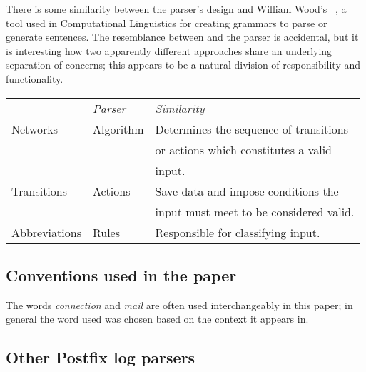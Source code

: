 There is some similarity between the parser's design and William Wood's
\ATN{}~\cite{atns, nlpip}, a tool used in Computational Linguistics for
creating grammars to parse or generate sentences.  The resemblance between
\ATN{} and the parser is accidental, but it is interesting how two
apparently different approaches share an underlying separation of concerns;
this appears to be a natural division of responsibility and functionality.


\begin{tabular}[]{lll}
    \textit{\ATN{}\/}   & \textit{Parser\/} & \textit{Similarity\/}     \\
    Networks            & Algorithm         & Determines the sequence 
                                              of transitions            \\
                        &                   & or actions which 
                                              constitutes a valid       \\
                        &                   & input.                    \\
    Transitions         & Actions           & Save data and impose
                                              conditions the            \\
                        &                   & input must meet to be
                                              considered valid.         \\
    Abbreviations       & Rules             & Responsible for 
                                              classifying input.        \\
\end{tabular}

\subsection{Conventions used in the paper}

The words \textit{connection\/} and \textit{mail\/} are often used
interchangeably in this paper; in general the word used was chosen based on
the context it appears in.

\subsection{Other Postfix log parsers}

